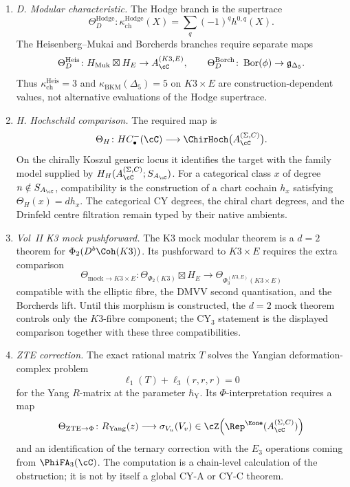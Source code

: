 \begin{theorem}
\begin{enumerate}[label=\textup{(\alph*)}]
\item \emph{D. Modular characteristic.}
The Hodge branch is the supertrace
\[
 \Theta_D^{\mathrm{Hodge}}\colon
 \kappa_{\mathrm{ch}}^{\mathrm{Hodge}}(X)
 =
 \sum_q(-1)^q h^{0,q}(X).
\]
The Heisenberg--Mukai and Borcherds branches require separate maps
\[
 \Theta_D^{\mathrm{Heis}}\colon
 H_{\mathrm{Muk}}\boxtimes H_E\to A_{\cC}^{(K3,E)},
 \qquad
 \Theta_D^{\mathrm{Borch}}\colon
 \operatorname{Bor}(\phi)\to \mathfrak g_{\Delta_5}.
\]
Thus $\kappa_{\mathrm{ch}}^{\mathrm{Heis}}=3$ and
$\kappa_{\mathrm{BKM}}(\Delta_5)=5$ on $K3\times E$ are construction-dependent
values, not alternative evaluations of the Hodge supertrace.

\item \emph{H. Hochschild comparison.}
The required map is
\[
 \Theta_H\colon
 HC^-_\bullet(\cC)
 \longrightarrow
 \ChirHoch\bigl(A_{\cC}^{(\Sigma,C)}\bigr).
\]
On the chirally Koszul generic locus it identifies the
target with the family model supplied by
$H_H(A_{\cC}^{(\Sigma,C)};S_{A_\cC})$.  For a categorical class
$x$ of degree $n\notin S_{A_\cC}$, compatibility is the construction
of a chart cochain $h_x$ satisfying $\Theta_H(x)=dh_x$.  The
categorical CY degrees, the chiral chart degrees, and the Drinfeld
centre filtration remain typed by their native ambients.

\item \emph{Vol~II K3 mock pushforward.}
The K3 mock modular theorem is a $d=2$ theorem for
$\Phi_2(D^b\Coh(K3))$. Its pushforward to $K3\times E$ requires the
extra comparison
\[
 \Theta_{\mathrm{mock}\to K3\times E}\colon
 \Theta_{\Phi_2(K3)}\boxtimes H_E
 \longrightarrow
 \Theta_{\Phi_3^{(K3,E)}(K3\times E)}
\]
compatible with the elliptic fibre, the DMVV second quantisation, and
the Borcherds lift. Until this morphism is constructed, the $d=2$
mock theorem controls only the $K3$-fibre component; the CY$_3$
statement is the displayed comparison together with these three
compatibilities.

\item \emph{ZTE correction.}
The exact rational matrix $T$ solves the Yangian deformation-complex
problem
\[
 \ell_1(T)+\ell_3(r,r,r)=0
\]
for the Yang $R$-matrix at the parameter $\hbar_{\mathrm{Y}}$. Its
$\Phi$-interpretation requires a map
\[
 \Theta_{\mathrm{ZTE}\to\Phi}\colon
 R_{\mathrm{Yang}}(z)
 \longrightarrow
 \sigma_{V_u}(V_v)
 \in
 \cZ\!\left(\Rep^{\Eone}(A_{\cC}^{(\Sigma,C)})\right)
\]
and an identification of the ternary correction with the $E_3$ operations
coming from $\PhiFA_3(\cC)$. The computation is a chain-level calculation of
the obstruction; it is not by itself a global CY-A or CY-C theorem.


\end{enumerate}
\end{theorem}
